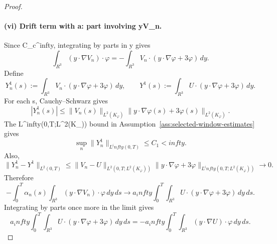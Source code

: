 \documentclass[11pt]{amsart}
\def\({}%
\def\){}%
\def\mathbb#1{#1}%
\def\infty{infty}%
\theoremstyle{plain}
\theoremstyle{definition}
\theoremstyle{remark}
\begin{document}
\begin{proof}
\paragraph{(vi) Drift term with \(a\): part involving \(y\cdot\nabla V_n\).}
Since \(\varphi\in C_c^\infty\), integrating by parts in \(y\) gives
\[
  \int_{\mathbb R^3}(y\cdot\nabla V_n)\cdot\varphi
  =-\int_{\mathbb R^3}V_n\cdot(y\cdot\nabla\varphi+3\varphi)
  \,dy.
\]
Define
\[
  Y_n^1(s):=\int_{\mathbb R^3}V_n\cdot(y\cdot\nabla\varphi+3\varphi)
  \,dy,
  \qquad
  Y^1(s):=\int_{\mathbb R^3}U\cdot(y\cdot\nabla\varphi+3\varphi)
  \,dy.
\]
For each \(s\), Cauchy--Schwarz gives
\[
  |Y_n^1(s)|
  \le
  \|V_n(s)\|_{L^2(K_\varphi)}
  \|y\cdot\nabla\varphi(s)+3\varphi(s)\|_{L^2(K_\varphi)}.
\]
The \(L^\infty(0,T;L^2(K_\varphi))\) bound in
Assumption~\ref{ass:selected-window-estimates} gives
\[
  \sup_n\|Y_n^1\|_{L^\infty(0,T)}\le C_1<\infty.
\]
Also,
\[
  \|Y_n^1-Y^1\|_{L^2(0,T)}
  \le
  \|V_n-U\|_{L^2(0,T;L^2(K_\varphi))}
  \|y\cdot\nabla\varphi+3\varphi\|_{L^\infty(0,T;L^2(K_\varphi))}
  \to0.
\]
Therefore
\[
  -\int_0^T\alpha_n(s)
  \int_{\mathbb R^3}(y\cdot\nabla V_n)\cdot\varphi
  \,dy\,ds
  \to
  a_\infty\int_0^T\!\int_{\mathbb R^3}U\cdot(y\cdot\nabla\varphi+3\varphi)
  \,dy\,ds.
\]
Integrating by parts once more in the limit gives
\[
  a_\infty\int_0^T\!\int_{\mathbb R^3}U\cdot(y\cdot\nabla\varphi+3\varphi)
  \,dy\,ds
  =
  -a_\infty\int_0^T\!\int_{\mathbb R^3}(y\cdot\nabla U)\cdot\varphi
  \,dy\,ds.
\]


\end{proof}
\end{document}
